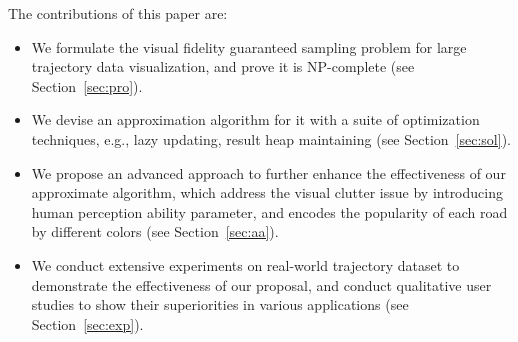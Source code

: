 The contributions of this paper are:
\begin{itemize}[noitemsep]
  \item We formulate the visual fidelity guaranteed sampling problem for large trajectory data visualization, and prove it is NP-complete (see Section~\ref{sec:pro}).
  \item We devise an approximation algorithm for it with a suite of optimization techniques, e.g., lazy updating, result heap maintaining (see Section~\ref{sec:sol}).
  \item We propose an advanced approach to further enhance the effectiveness of our approximate algorithm, which address the visual clutter issue by introducing human perception ability parameter,
  and encodes the popularity of each road by different colors (see Section~\ref{sec:aa}).
  \item We conduct extensive experiments on real-world trajectory dataset to demonstrate the effectiveness of our proposal, and conduct qualitative user studies to show their superiorities in various applications
  (see Section~\ref{sec:exp}).
\end{itemize}



%


